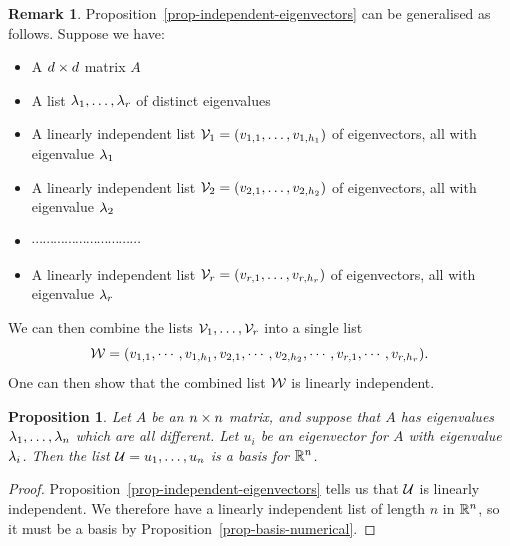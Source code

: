 \documentclass[reqno]{amsart}
\newtheorem{proposition}[theorem]{Proposition}
\theoremstyle{definition}
\newtheorem{remark}[theorem]{Remark}
\begin{document}
\begin{remark}\label{rem-block-independent-eigenvectors}
 Proposition~\ref{prop-independent-eigenvectors} can be generalised as
 follows.  Suppose we have:
 \begin{itemize}
  \item A $d\times d$ matrix $A$
  \item A list $\lambda_1,\dotsc,\lambda_r$ of distinct eigenvalues
  \item A linearly independent list $\mathcal{V}_1=(v_{1,1},\dotsc,v_{1,h_1})$
   of eigenvectors, all with eigenvalue $\lambda_1$
  \item A linearly independent list $\mathcal{V}_2=(v_{2,1},\dotsc,v_{2,h_2})$
   of eigenvectors, all with eigenvalue $\lambda_2$
  \item $\dotsb\dotsb\dotsb\dotsb\dotsb\dotsb\dotsb\dotsb\dotsb\dotsb$
  \item A linearly independent list $\mathcal{V}_r=(v_{r,1},\dotsc,v_{r,h_r})$
   of eigenvectors, all with eigenvalue $\lambda_r$
 \end{itemize}
 We can then combine the lists $\mathcal{V}_1,\dotsc,\mathcal{V}_r$ into a single list
 \[ \mathcal{W} = (v_{1,1},\dotsb,v_{1,h_1},v_{2,1},\dotsb,v_{2,h_2},\dotsb,
           v_{r,1},\dotsb,v_{r,h_r}).
 \]
 One can then show that the combined list $\mathcal{W}$ is linearly independent.
\end{remark}

\begin{proposition}\label{prop-eigen-basis}
 Let $A$ be an $n\times n$ matrix, and suppose that $A$ has eigenvalues
 $\lambda_1,\dotsc,\lambda_n$ which are all different.  Let $u_i$ be an
 eigenvector for $A$ with eigenvalue $\lambda_i$.  Then the list
 $\mathcal{U}=u_1,\dotsc,u_n$ is a basis for ${\mathbb{R}}^n$.
\end{proposition}
\begin{proof}
 Proposition~\ref{prop-independent-eigenvectors} tells us that $\mathcal{U}$
 is linearly independent.  We therefore have a linearly independent
 list of length $n$ in ${\mathbb{R}}^n$, so it must be a basis by
 Proposition~\ref{prop-basis-numerical}.
\end{proof}
\end{document}
